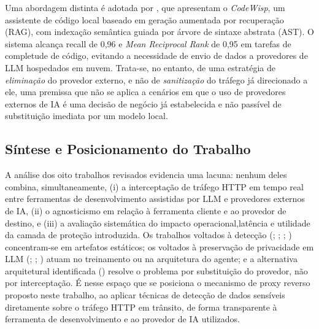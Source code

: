 Uma abordagem distinta é adotada por , que apresentam o \textit{CodeWisp}, um assistente de código local baseado em geração aumentada por recuperação (RAG), com indexação semântica guiada por árvore de sintaxe abstrata (AST). O sistema alcança recall de 0,96 e \textit{Mean Reciprocal Rank} de 0,95 em tarefas de completude de código, evitando a necessidade de envio de dados a provedores de LLM hospedados em nuvem. Trata-se, no entanto, de uma estratégia de \textit{eliminação} do provedor externo, e não de \textit{sanitização} do tráfego já direcionado a ele, uma premissa que não se aplica a cenários em que o uso de provedores externos de IA é uma decisão de negócio já estabelecida e não passível de substituição imediata por um modelo local.

\subsection{Síntese e Posicionamento do Trabalho}

A análise dos oito trabalhos revisados evidencia uma lacuna: nenhum deles combina, simultaneamente, (i) a interceptação de tráfego HTTP em tempo real entre ferramentas de desenvolvimento assistidas por LLM e provedores externos de IA, (ii) o agnosticismo em relação à ferramenta cliente e ao provedor de destino, e (iii) a avaliação sistemática do impacto operacional,latência e utilidade da camada de proteção introduzida. Os trabalhos voltados à detecção (; ; ; ) concentram-se em artefatos estáticos; os voltados à preservação de privacidade em LLM (; ; ) atuam no treinamento ou na arquitetura do agente; e a alternativa arquitetural identificada () resolve o problema por substituição do provedor, não por interceptação. É nesse espaço que se posiciona o mecanismo de proxy reverso proposto neste trabalho, ao aplicar técnicas de detecção de dados sensíveis diretamente sobre o tráfego HTTP em trânsito, de forma transparente à ferramenta de desenvolvimento e ao provedor de IA utilizados.




